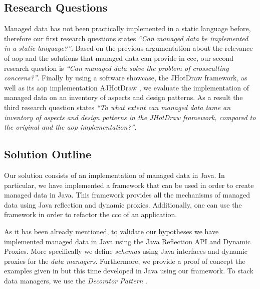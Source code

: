 \subsection{Research Questions}\label{Research Questions}
Managed data has not been practically implemented in a static language before, therefore our first research questions states 
\textit{``Can managed data be implemented in a static language?''}.
Based on the previous argumentation about the relevance of \ac{aop} and the solutions that managed data can provide in \acrlong{ccc}, our second research question is \textit{``Can managed data solve the problem of crosscutting concerns?''}. 
Finally by using a software showcase, the JHotDraw framework, as well as its \ac{aop} implementation AJHotDraw \cite{marinajhotdraw}, 
we evaluate the implementation of managed data on an inventory of aspects and design patterns. 
As a result the third research question states \textit{``To what extent can managed data tame an inventory of aspects and design patterns in the JHotDraw framework, compared to the original and the \ac{aop} implementation?''}.

\subsection{Solution Outline}\label{Solution Outline}
Our solution consists of an implementation of managed data in Java. 
In particular, we have implemented a framework that can be used in order to create managed data in Java.
This framework provides all the mechanisms of managed data using Java reflection and dynamic proxies. Additionally, one can use the framework in order to refactor the \ac{ccc} of an application.

As it has been already mentioned, to validate our hypotheses we have implemented managed data in Java using the Java Reflection API and Dynamic Proxies. 
More specifically we define \textit{schemas} using Java interfaces and dynamic proxies for the \textit{data managers}. 
Furthermore, we provide a proof of concept the examples given in \cite{loh2012managed} but this time developed in Java using our framework. 
To stack data managers\cite{loh2012managed}, we use the \textit{Decorator Pattern} \cite{gamma1995design}. 

